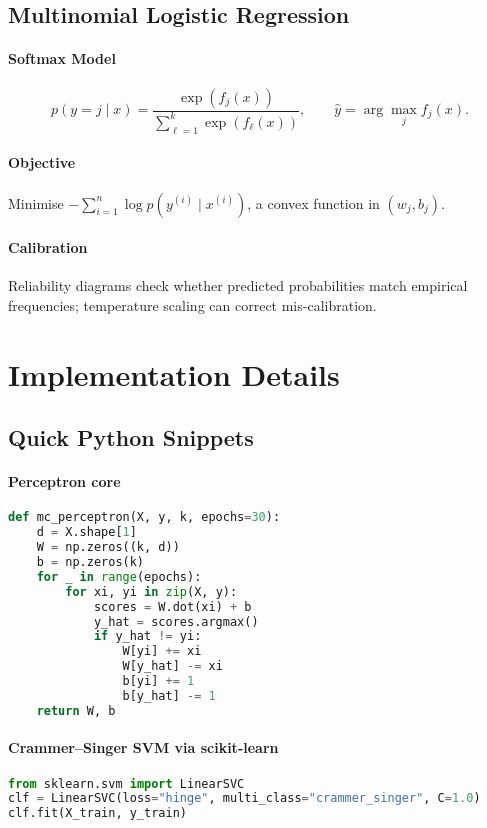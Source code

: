 \documentclass{article}
\begin{document}
\subsection{Multinomial Logistic Regression}
\paragraph{Softmax Model}
\[
p(y=j\mid x)=
\frac{\exp(f_{j}(x))}{\sum_{\ell=1}^{k}\exp(f_{\ell}(x))},
\qquad
\hat y=\arg\max_{j}f_{j}(x).
\]
\paragraph{Objective}
Minimise
$-\sum_{i=1}^{n}\log p(y^{(i)}\mid x^{(i)})$,
a convex function in $(w_{j},b_{j})$.
\paragraph{Calibration}
Reliability diagrams check whether predicted probabilities
match empirical frequencies; temperature scaling can correct mis-calibration.

\section{Implementation Details}\label{sec:impl}
\subsection*{Quick Python Snippets}
\paragraph{Perceptron core}
\begin{lstlisting}[language=Python,basicstyle=\ttfamily\small]
def mc_perceptron(X, y, k, epochs=30):
    d = X.shape[1]
    W = np.zeros((k, d))
    b = np.zeros(k)
    for _ in range(epochs):
        for xi, yi in zip(X, y):
            scores = W.dot(xi) + b
            y_hat = scores.argmax()
            if y_hat != yi:
                W[yi] += xi
                W[y_hat] -= xi
                b[yi] += 1
                b[y_hat] -= 1
    return W, b
\end{lstlisting}

\paragraph{Crammer--Singer SVM via scikit-learn}
\begin{lstlisting}[language=Python,basicstyle=\ttfamily\small]
from sklearn.svm import LinearSVC
clf = LinearSVC(loss="hinge", multi_class="crammer_singer", C=1.0)
clf.fit(X_train, y_train)
\end{lstlisting}
\end{document}
